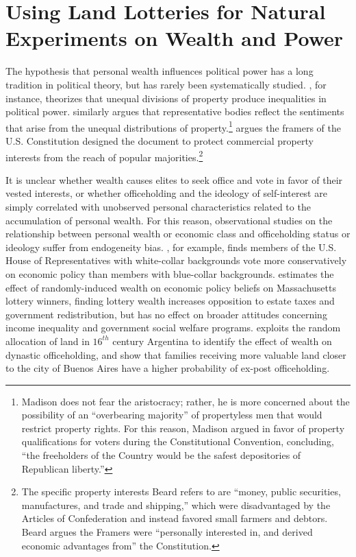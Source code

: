 \chapter{Using Land Lotteries for Natural Experiments on Wealth and Power} \label{land-lotteries}

The hypothesis that personal wealth influences political power has a long tradition in political theory, but has rarely been systematically studied. \citet{ferguson1767}, for instance, theorizes that unequal divisions of property produce inequalities in political power. \citet{madison1787} similarly argues that representative bodies reflect the sentiments that arise from the unequal distributions of property.\footnote{Madison does not fear the aristocracy; rather, he is more concerned about the possibility of an ``overbearing majority'' of propertyless men that would restrict property rights. For this reason, Madison argued in favor of property qualifications for voters during the Constitutional Convention, concluding, ``the freeholders of the Country would be the safest depositories of Republican liberty.''} \citet{beard1913} argues the framers of the U.S. Constitution designed the document to protect commercial property interests from the reach of popular majorities.\footnote{The specific property interests Beard refers to are ``money, public securities, manufactures, and trade and shipping,'' which were disadvantaged by the Articles of Confederation and instead favored small farmers and debtors. Beard argues the Framers were ``personally interested in, and derived economic advantages from'' the Constitution.} 

It is unclear whether wealth causes elites to seek office and vote in favor of their vested interests, or whether officeholding and the ideology of self-interest are simply correlated with unobserved personal characteristics related to the accumulation of personal wealth. For this reason, observational studies on the relationship between personal wealth or economic class and officeholding status or ideology suffer from endogeneity bias. \citet{carnes2012}, for example, finds members of the U.S. House of Representatives with white-collar backgrounds vote more conservatively on economic policy than members with blue-collar backgrounds. \citet{doherty2006} estimates the effect of randomly-induced wealth on economic policy beliefs on Massachusetts lottery winners, finding lottery wealth increases opposition to estate taxes and government redistribution, but has no effect on broader attitudes concerning income inequality and government social welfare programs. \citet{rossi2014} exploits the random allocation of land in $16^{th}$ century Argentina to identify the effect of wealth on dynastic officeholding, and show that families receiving more valuable land closer to the city of Buenos Aires have a higher probability of ex-post officeholding. 

